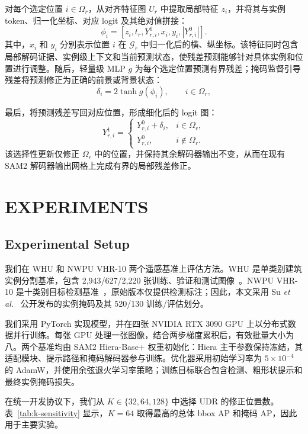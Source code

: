 \documentclass{article}
\begin{document}
\indent 对每个选定位置 $i\in\Omega_r$，从对齐特征图 $U_r$ 中提取局部特征 $z_i$，并将其与实例 token、归一化坐标、对应 logit 及其绝对值拼接：
\begin{equation}
\phi_i=[z_i,t_r,Y^0_{r,i},x_i,y_i,|Y^0_{r,i}|].
\label{eq:udpr-input}
\end{equation}
\indent 其中，$x_i$ 和 $y_i$ 分别表示位置 $i$ 在 $\mathcal{G}_r$ 中归一化后的横、纵坐标。该特征同时包含局部解码证据、实例级上下文和当前预测状态，使残差预测能够针对具体实例和位置进行调整。随后，轻量级 MLP $g$ 为每个选定位置预测有界残差；掩码监督引导残差将预测修正为正确的前景或背景状态：
\begin{equation}
\delta_i=2\tanh g(\phi_i),\qquad i\in\Omega_r,
\label{eq:udpr}
\end{equation}

\indent 最后，将预测残差写回对应位置，形成细化后的 logit 图：
\begin{equation}
Y^1_{r,i}=\begin{cases}
Y^0_{r,i}+\delta_i, & i\in\Omega_r,\\
Y^0_{r,i}, & i\notin\Omega_r.
\end{cases}
\label{eq:udpr-scatter}
\end{equation}
\indent 该选择性更新仅修正 $\Omega_r$ 中的位置，并保持其余解码器输出不变，从而在现有 SAM2 解码器输出网格上完成有界的局部残差修正。

\section{EXPERIMENTS}
\subsection{Experimental Setup}
我们在 WHU 和 NWPU VHR-10 两个遥感基准上评估方法。WHU 是单类别建筑实例分割基准，包含 2,943/627/2,220 张训练、验证和测试图像~\cite{whu}。NWPU VHR-10 是十类别目标检测基准~\cite{nwpu}，原始版本仅提供检测标注；因此，本文采用 Su \textit{et al.}~\cite{nwpu_instance} 公开发布的实例掩码及其 520/130 训练/评估划分。

我们采用 PyTorch 实现模型，并在四张 NVIDIA RTX 3090 GPU 上以分布式数据并行训练。每张 GPU 处理一张图像，结合两步梯度累积后，有效批量大小为八。两个基准均由 SAM2 Hiera-Base+ 权重初始化：Hiera 主干参数保持冻结，其适配模块、提示路径和掩码解码器参与训练。优化器采用初始学习率为 $5\times10^{-4}$ 的 AdamW，并使用余弦退火学习率策略；训练目标联合包含检测、粗形状提示和最终实例掩码损失。

在统一开发协议下，我们从 $K\in\{32,64,128\}$ 中选择 UDR 的修正位置数。表~\ref{tab:k-sensitivity} 显示，$K=64$ 取得最高的总体 bbox AP 和掩码 AP，因此用于主要实验。
\end{document}
